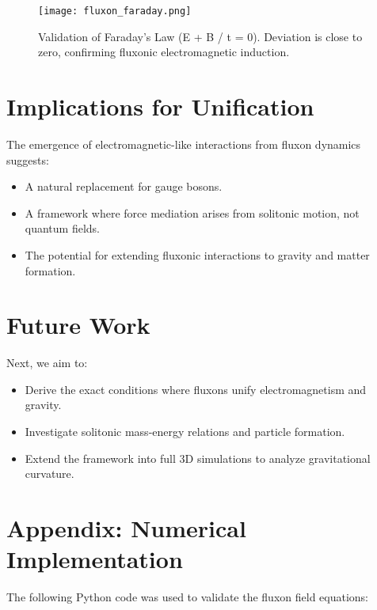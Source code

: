 \documentclass{article}
\begin{document}
\begin{figure}[h]
    \centering
    \texttt{[image: fluxon\_faraday.png]}
    \caption{Validation of Faraday’s Law (\nabla \times E + \partial B / \partial t = 0). Deviation is close to zero, confirming fluxonic electromagnetic induction.}
    \label{fig:faraday}
\end{figure}

\section{Implications for Unification}
The emergence of electromagnetic-like interactions from fluxon dynamics suggests:
\begin{itemize}
    \item A natural replacement for gauge bosons.
    \item A framework where force mediation arises from solitonic motion, not quantum fields.
    \item The potential for extending fluxonic interactions to gravity and matter formation.
\end{itemize}

\section{Future Work}
Next, we aim to:
\begin{itemize}
    \item Derive the exact conditions where fluxons unify electromagnetism and gravity.
    \item Investigate solitonic mass-energy relations and particle formation.
    \item Extend the framework into full 3D simulations to analyze gravitational curvature.
\end{itemize}

\section{Appendix: Numerical Implementation}
The following Python code was used to validate the fluxon field equations:
\end{document}
